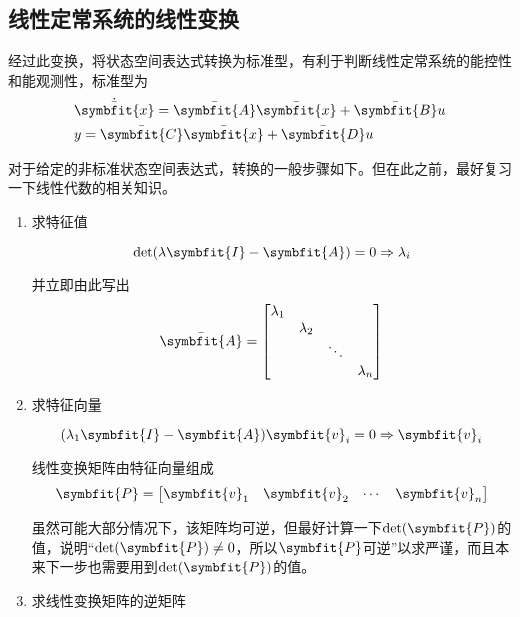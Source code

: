 \subsection{线性定常系统的线性变换}

经过此变换，将状态空间表达式转换为标准型，有利于判断线性定常系统的能控性和能观测性，标准型为
\begin{align}
    & \dot{\bar{\symbfit{x}}} = \bar{\symbfit{A}} \bar{\symbfit{x}} + \bar{\symbfit{B}}u \\
    & y = \bar{\symbfit{C}} \bar{\symbfit{x}} + \bar{\symbfit{D}}u
\end{align}

对于给定的非标准状态空间表达式，转换的一般步骤如下。但在此之前，最好复习一下线性代数的相关知识。

\begin{enumerate}
    \item 求特征值
    
    \begin{equation}
        \det(\lambda \symbfit{I} - \symbfit{A}) = 0 \Rightarrow \lambda_i
    \end{equation}

    并立即由此写出
    \begin{equation}
        \bar{\symbfit{A}} = \begin{bmatrix}
            \lambda_1 & & & \\
            & \lambda_2 & & \\
            & & \ddots &    \\
            & & & \lambda_n \\
        \end{bmatrix}
    \end{equation}
    \item 求特征向量
    
    \begin{equation}
        (\lambda_1 \symbfit{I} - \symbfit{A}) \symbfit{v}_i = 0 \Rightarrow \symbfit{v}_i
    \end{equation}

    线性变换矩阵由特征向量组成
    \begin{equation}
        \symbfit{P} = \begin{bmatrix}
            \symbfit{v}_1 & \symbfit{v}_2 & \cdots & \symbfit{v}_n
        \end{bmatrix}
    \end{equation}

    虽然可能大部分情况下，该矩阵均可逆，但最好计算一下$\det(\symbfit{P})$的值，说明“$\det(\symbfit{P}) \neq 0$，所以$\symbfit{P}$可逆”以求严谨，而且本来下一步也需要用到$\det(\symbfit{P})$的值。
    \item 求线性变换矩阵的逆矩阵
    

\end{enumerate}
